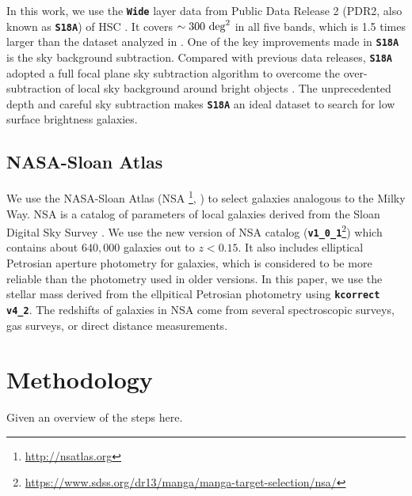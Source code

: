\documentclass[twocolumn,astrosymb,twocolappendix]{aastex631}
\newcommand{\code}[1]{\textbf{\texttt{#1}}}
\begin{document}
\begin{CJK*}{UTF8}{gbsn}
In this work, we use the \code{Wide} layer data from Public Data Release 2 (PDR2, also known as \code{S18A}) of HSC \citealt{Aihara2018}. It covers $\sim 300\ \rm{deg}^2$ in all five bands, which is 1.5 times larger than the dataset analyzed in . One of the key improvements made in \code{S18A} is the sky background subtraction. Compared with previous data releases, \code{S18A} adopted a full focal plane sky subtraction algorithm to overcome the over-subtraction of local sky background around bright objects \citep{Aihara2018,Li2021}. The unprecedented depth and careful sky subtraction makes \code{S18A} an ideal dataset to search for low surface brightness galaxies. 


\subsection{NASA-Sloan Atlas}
We use the NASA-Sloan Atlas (NSA \footnote{\url{http://nsatlas.org}}, \citealt{Blanton2005,Blanton2011}) to select galaxies analogous to the Milky Way. NSA is a catalog of parameters of local galaxies derived from the Sloan Digital Sky Survey \citep[SDSS,][]{York2000}. We use the new version of NSA catalog (\code{v1\_0\_1}\footnote{\url{https://www.sdss.org/dr13/manga/manga-target-selection/nsa/}}) which contains about $640,000$ galaxies out to $z < 0.15$. It also includes elliptical Petrosian aperture photometry for galaxies, which is considered to be more reliable than the photometry used in older versions. In this paper, we use the stellar mass derived from the ellpitical Petrosian photometry using \code{kcorrect v4\_2}. The redshifts of galaxies in NSA come from several spectroscopic surveys, gas surveys, or direct distance measurements. 



\section{Methodology}
Given an overview of the steps here.


\end{CJK*}
\end{document}
